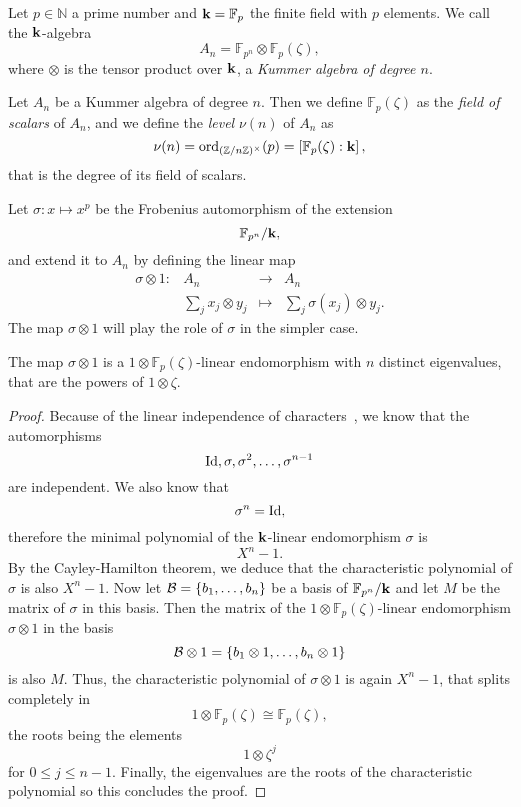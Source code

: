 \begin{defi}
  Let $p\in\mathbb{N}$ a prime number and $\mathbf{k}=\mathbb{F}_p$ the finite field
  with $p$ elements.
 We call the $\mathbf{k}$-algebra
 \[
   A_n = \mathbb{F}_{p^n}\otimes\mathbb{F}_{p}(\zeta),
 \]
 where $\otimes$ is the tensor product over $\mathbf{k}$, a \emph{Kummer algebra of
 degree $n$}.
\end{defi}
\begin{defi}
  Let $A_n$ be a Kummer algebra of degree $n$. Then we define
  $\mathbb{F}_{p}(\zeta)$ as the \emph{field of scalars} of $A_n$, and we
  define the \emph{level} $\nu(n)$ of $A_n$ as
  \[
    \nu(n) = \mathrm{ord}_{(\mathbb{Z}/n\mathbb{Z})^\times}(p) = \left[
      \mathbb{F}_{p}(\zeta):\mathbf{k} \right],
  \]
  that is the degree of its field of scalars.
\end{defi}
Let $\sigma:x\mapsto x^p$ be the Frobenius automorphism of the extension
\[
  \mathbb{F}_{p^n}/\mathbf{k},
\]
and extend it to $A_n$ by defining the linear map
\[
  \begin{array}{cccc}
    \sigma\otimes 1: & A_n & \to & A_n\\
    & \sum_j x_j\otimes y_j & \mapsto & \sum_j \sigma(x_j) \otimes y_j.
  \end{array}
\]
The map $\sigma\otimes 1$ will play the role of $\sigma$ in the simpler case.
\begin{lm}
  The map $\sigma\otimes1$ is a $1\otimes\mathbb{F}_{p}(\zeta)$-linear
  endomorphism with $n$ distinct eigenvalues, that are the powers of
  $1\otimes\zeta$.
\end{lm}
\begin{proof}
  Because of the linear independence of characters~\cite[Chapter VI,
  §4]{Lang04}, we know that the automorphisms
  \[
    \operatorname{Id}, \sigma, \sigma^2, \dots, \sigma^{n-1}
  \]
  are independent. We also know that 
  \[
    \sigma^n = \operatorname{Id},
  \]
  therefore the minimal polynomial of the $\mathbf{k}$-linear endomorphism $\sigma$ is
  \[
    X^n-1.
  \]
  By the Cayley-Hamilton theorem, we deduce that the characteristic
  polynomial of $\sigma$ is also $X^n-1$. Now let $\mathcal{B}=\left\{ b_1, \dots, b_n \right\}$ be a basis of
  $\mathbb{F}_{p^n}/\mathbf{k}$ and let $M$ be the matrix of $\sigma$ in this basis.
  Then the matrix of the $1\otimes\mathbb{F}_p(\zeta)$-linear endomorphism
  $\sigma\otimes1$ in the basis
  \[
    \mathcal{B}\otimes 1 =\left\{ b_1\otimes1, \dots, b_n\otimes1 \right\}
  \]
  is also $M$. Thus, the characteristic polynomial of $\sigma\otimes1$ is again
  $X^n-1$, that splits completely in 
  \[
    1\otimes\mathbb{F}_{p}(\zeta)\cong \mathbb{F}_{p}(\zeta),
  \]
  the roots being the elements
  \[
    1\otimes\zeta^j
  \]
  for $0\leq j\leq n-1$. Finally, the eigenvalues are the roots of the
  characteristic polynomial so this concludes the proof.
\end{proof}
